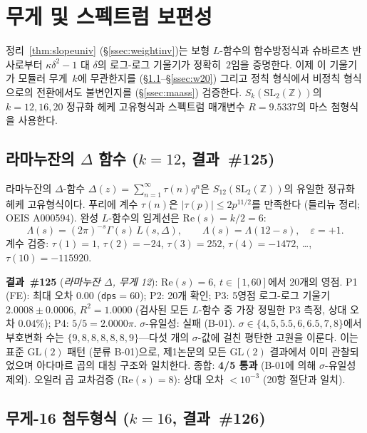 \documentclass[11pt, a4paper]{article}
\theoremstyle{plain}
\theoremstyle{definition}
\begin{document}
\section{무게 및 스펙트럼 보편성}
\label{sec:modular}

정리~\ref{thm:slopeuniv} (\S\ref{ssec:weightinv})는
보형 $L$-함수의 함수방정식과 슈바르츠 반사로부터
$\kappa\delta^{2}-1$ 대 $\delta$의 로그-로그 기울기가 정확히~$2$임을 증명한다.
이제 이 기울기가 모듈러 무게~$k$에 무관한지를
(\S\ref{ssec:delta12}--\S\ref{ssec:w20})
그리고 정칙 형식에서 비정칙 형식으로의 전환에서도 불변인지를
(\S\ref{ssec:maass}) 검증한다.
$S_k(\mathrm{SL}_2(\mathbb{Z}))$의 $k=12,16,20$ 정규화 헤케 고유형식과
스펙트럼 매개변수 $R=9.5337$의 마스 첨형식을 사용한다.

\subsection{라마누잔의 $\Delta$ 함수 ($k=12$, 결과~\#125)}
\label{ssec:delta12}

라마누잔의 $\Delta$-함수 $\Delta(z)=\sum_{n=1}^{\infty}\tau(n)q^n$은
$S_{12}(\mathrm{SL}_2(\mathbb{Z}))$의 유일한 정규화 헤케 고유형식이다.
푸리에 계수 $\tau(n)$은 $|\tau(p)|\leq 2p^{11/2}$를 만족한다
(들리뉴 정리; OEIS A000594). 완성 $L$-함수의 임계선은 $\mathrm{Re}(s)=k/2=6$:
\[
  \Lambda(s) = (2\pi)^{-s}\Gamma(s)\,L(s,\Delta), \qquad
  \Lambda(s)=\Lambda(12-s), \quad \varepsilon=+1.
\]
계수 검증: $\tau(1)=1$, $\tau(2)=-24$, $\tau(3)=252$,
$\tau(4)=-1472$, \ldots, $\tau(10)=-115920$.

\medskip
\noindent\textbf{결과~\#125} (\textit{라마누잔 $\Delta$, 무게 12}):
$\mathrm{Re}(s)=6$, $t\in[1,60]$에서 20개의 영점.
P1 (FE): 최대 오차 $0.00$ (\texttt{dps}$=60$); P2: 20개 확인;
P3: 5영점 로그-로그 기울기 $\mathbf{2.0008\pm 0.0006}$, $R^{2}=1.0000$
(검사된 모든 $L$-함수 중 가장 정밀한 P3 측정, 상대 오차 $0.04\%$);
P4: $5/5=2.0000\pi$.
$\sigma$-유일성: 실패 (B-01). $\sigma\in\{4,5,5.5,6,6.5,7,8\}$에서
부호변화 수는 $\{9,8,8,8,8,8,9\}$---다섯 개의 $\sigma$-값에 걸친 평탄한
고원을 이룬다. 이는 표준 $\mathrm{GL}(2)$ 패턴 (분류 B-01)으로,
제1논문의 모든 $\mathrm{GL}(2)$ 결과에서 이미 관찰되었으며
아다마르 곱의 대칭 구조와 일치한다. 종합: \textbf{4/5 통과}
(B-01에 의해 $\sigma$-유일성 제외). 오일러 곱 교차검증
($\mathrm{Re}(s)=8$): 상대 오차 $<10^{-3}$ (20항 절단과 일치).

\subsection{무게-16 첨두형식 ($k=16$, 결과~\#126)}
\label{ssec:w16}
\end{document}
